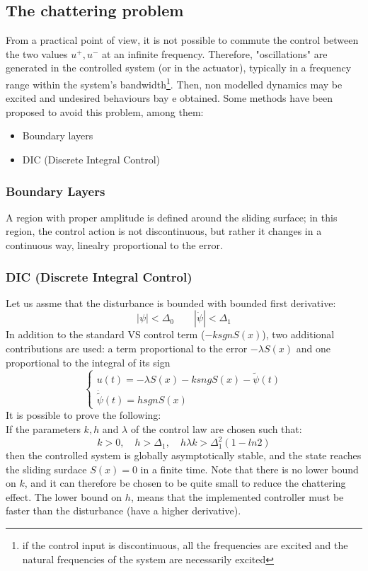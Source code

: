 \documentclass{book}
\begin{document}
\subsection{The chattering problem}
From a practical point of view, it is not possible to commute the control between the two values $u^+,u^-$ at an infinite frequency. Therefore, "oscillations" are generated in the controlled system (or in the actuator), typically in a frequency range within the system's bandwidth\footnote{if the control input is discontinuous, all the frequencies are excited and the natural frequencies of the system are necessarily excited}. Then, non modelled dynamics may be excited and undesired behaviours bay e obtained. Some methods have been proposed to avoid this problem, among them:
\begin{itemize}
    \item Boundary layers
    \item DIC (Discrete Integral Control)
\end{itemize}
\subsubsection{Boundary Layers}
A region with proper amplitude is defined around the sliding surface; in this region, the control action is not discontinuous, but rather it changes in a continuous way, linealry proportional to the error.
\subsubsection{DIC (Discrete Integral Control)}
Let us assme that the disturbance is bounded with bounded first derivative:
\[
    |\psi|<\Delta_0 \qquad |\dot{\psi}|<\Delta_1
\]
In addition to the standard VS control term ($-k sgnS(x)$), two additional contributions are used: a term proportional to the error $-\lambda S(x)$ and one proportional to the integral of its sign
\[
    \begin{cases}
        u(t) = -\lambda S(x) -ksngS(x)-\tilde{\psi}(t)\\
        \dot{\tilde{\psi}} (t) = h sgn S(x)
    \end{cases}
\]
It is possible to prove the following: \\
If the parameters $k,h$ and $\lambda$ of the control law are chosen such that:
\[
    k>0, \quad h>\Delta_1, \quad h\lambda k > \Delta_1^2(1-ln2)
\]
then the controlled system is globally asymptotically stable, and the state reaches the sliding surdace $S(x)=0$ in a finite time.
Note that there is no lower bound on $k$, and it can therefore be chosen to be quite small to reduce the chattering effect. The lower bound on $h$, means that the implemented controller must be faster than the disturbance (have a higher derivative). 
\end{document}
